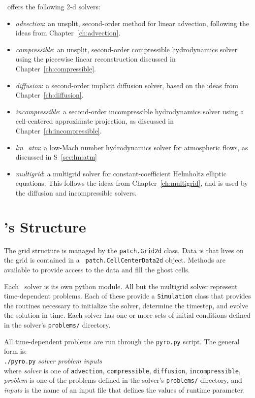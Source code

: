 \pyro\ offers the following 2-d solvers:
\begin{itemize}
\item {\em advection}: an unsplit, second-order method for linear advection,
  following the ideas from Chapter~\ref{ch:advection}.

\item {\em compressible}: an unsplit, second-order compressible hydrodynamics
  solver using the piecewise linear reconstruction discussed in Chapter~\ref{ch:compressible}.

\item {\em diffusion}: a second-order implicit diffusion solver, based
  on the ideas from Chapter~\ref{ch:diffusion}.

\item {\em incompressible}: a second-order incompressible hydrodynamics
  solver using a cell-centered approximate projection, as discussed
  in Chapter~\ref{ch:incompressible}.

\item {\em lm\_atm}: a low-Mach number hydrodynamics solver for
  atmospheric flows, as discussed in S~\ref{sec:lm:atm}
  
\item {\em multigrid}: a multigrid solver for constant-coefficient Helmholtz
  elliptic equations.  This follows the ideas from Chapter~\ref{ch:multigrid},
  and is used by the diffusion and incompressible solvers.

\end{itemize}

\section{\pyro 's Structure}

The grid structure is managed by the {\tt patch.Grid2d} class.  Data
is that lives on the grid is contained in a {\tt
  patch.CellCenterData2d} object.  Methods are available to provide
access to the data and fill the ghost cells.

Each \pyro\ solver is its own python module.  All but the multigrid
solver represent time-dependent problems.  Each of these provide a
{\tt Simulation} class that provides the routines necessary to
initialize the solver, determine the timestep, and evolve the solution
in time.  Each solver has one or more sets of initial conditions
defined in the solver's {\tt problems/} directory.

All time-dependent problems are run through the {\tt pyro.py} script.
The general form is: \\[0.5em]
{\tt ./pyro.py} {\em solver problem inputs} \\[0.5em]
where {\em solver} is one of {\tt advection}, {\tt compressible},
{\tt diffusion}, {\tt incompressible}, {\em problem} is
one of the problems defined in the solver's {\tt problems/}
directory, and {\em inputs} is the name of an input file
that defines the values of runtime parameter. 

